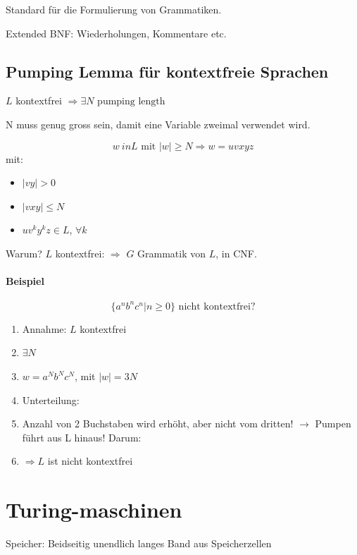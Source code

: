 Standard für die Formulierung von Grammatiken.

Extended BNF: Wiederholungen, Kommentare etc.


\subsection{Pumping Lemma für kontextfreie Sprachen}

$L$ kontextfrei $\Rightarrow \exists N \text{ pumping length }$

N muss genug gross sein, damit eine Variable zweimal verwendet wird.

\[
	w \ in L \text{ mit } |w| \geq N \Rightarrow w = uvxyz
\]
mit:
\begin{itemize}
	\item $|vy| > 0$
	\item $|vxy | \leq N$
	\item $uv^ky^kz \in L$, $\forall k$
\end{itemize}

Warum? $L$ kontextfrei: $\Rightarrow$ $G$ Grammatik von $L$, in CNF.




\paragraph{Beispiel}

\[
	\{a^n b^n c^n | n \geq 0 \} \text{ nicht kontextfrei?}
\]

\begin{enumerate}
	\item Annahme: $L$ kontextfrei
	\item $\exists N$
	\item $w = a^N b^N c^N$, mit $|w| = 3N$
	\item Unterteilung: %
	\item Anzahl von 2 Buchstaben wird erhöht, aber nicht vom dritten!
		$\rightarrow$ Pumpen führt aus L hinaus! Darum:
	\item $\Rightarrow L$ ist nicht kontextfrei
\end{enumerate}

\section{Turing-maschinen}

Speicher: Beidseitig unendlich langes Band aus Speicherzellen

